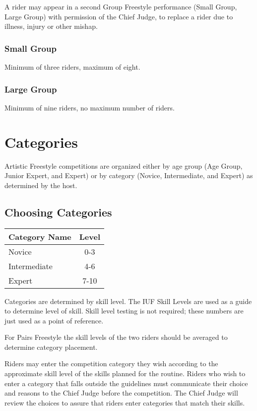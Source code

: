 A rider may appear in a second Group Freestyle performance (Small Group, Large Group) with permission of the Chief Judge, to replace a rider due to illness, injury or other mishap.

\subsubsection{Small Group}
Minimum of three riders, maximum of eight.

\subsubsection{Large Group}
Minimum of nine riders, no maximum number of riders.

\section{Categories}

Artistic Freestyle competitions are organized either by age group (Age Group, Junior Expert, and Expert) or by category (Novice, Intermediate, and Expert) as determined by the host.

\subsection{Choosing Categories \label{subsec:freestyle-choosing_categories}}

\begin{tabular}{|l|c|}
\hline
\textbf{Category Name} & \textbf{Level} \\
\hline
Novice & 0-3 \\
\hline
Intermediate & 4-6 \\
\hline
Expert & 7-10 \\
\hline
\end{tabular}

Categories are determined by skill level.
The IUF Skill Levels are used as a guide to determine level of skill.
Skill level testing is not required; these numbers are just used as a point of reference.

For Pairs Freestyle the skill levels of the two riders should be averaged to determine category placement.

Riders may enter the competition category they wish according to the approximate skill
level of the skills planned for the routine.
Riders who wish to enter a category that falls outside the guidelines must communicate their choice and reasons to the Chief Judge before the competition.
The Chief Judge will review the choices to assure that riders enter categories that match their skills.

